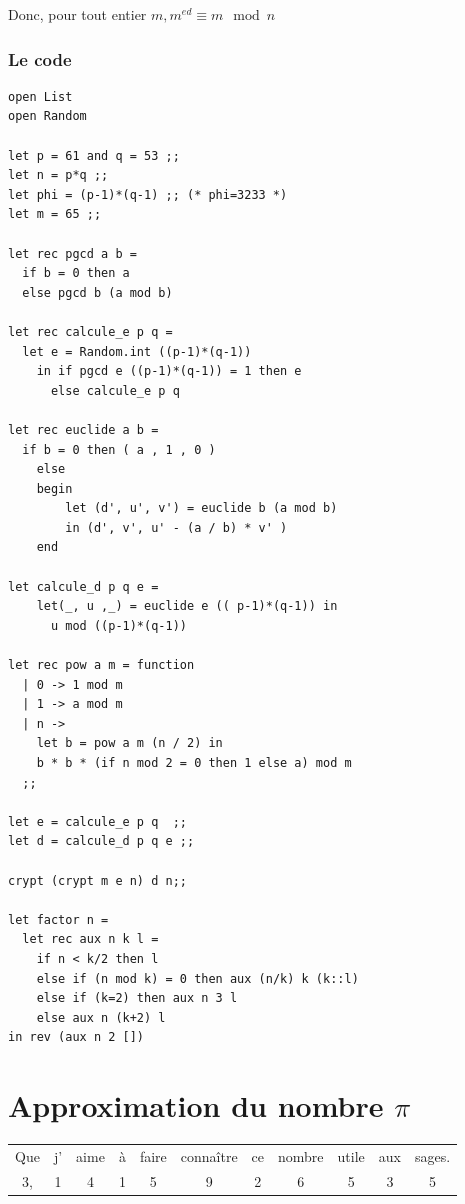 \documentclass[11pt]{book}
\begin{document}
 Donc, pour tout entier $m, m^{ed} ≡ m \mod n$

 \subsubsection{Le code}
 \begin{Verbatim}
open List
open Random 

let p = 61 and q = 53 ;;
let n = p*q ;;
let phi = (p-1)*(q-1) ;; (* phi=3233 *)
let m = 65 ;;

let rec pgcd a b =
  if b = 0 then a 
  else pgcd b (a mod b)

let rec calcule_e p q =
  let e = Random.int ((p-1)*(q-1))
    in if pgcd e ((p-1)*(q-1)) = 1 then e
      else calcule_e p q  

let rec euclide a b = 
  if b = 0 then ( a , 1 , 0 ) 
    else 
    begin
        let (d', u', v') = euclide b (a mod b)
        in (d', v', u' - (a / b) * v' )
    end

let calcule_d p q e =
    let(_, u ,_) = euclide e (( p-1)*(q-1)) in
      u mod ((p-1)*(q-1))

let rec pow a m = function
  | 0 -> 1 mod m
  | 1 -> a mod m
  | n -> 
    let b = pow a m (n / 2) in
    b * b * (if n mod 2 = 0 then 1 else a) mod m
  ;;    

let e = calcule_e p q  ;;
let d = calcule_d p q e ;;

crypt (crypt m e n) d n;;

let factor n =
  let rec aux n k l =
    if n < k/2 then l
    else if (n mod k) = 0 then aux (n/k) k (k::l)
    else if (k=2) then aux n 3 l 
    else aux n (k+2) l
in rev (aux n 2 [])
\end{Verbatim}

 \section{Approximation du nombre $\pi$ }

\begin{center}
	\begin{tabular}{ccccccccccc}
		Que & j'& aime & à & faire & connaître & ce & nombre & utile & aux & sages. \\
		3,   & 1 &  4   & 1 &  5    &  9        & 2  &  6     &  5    & 3   & 5 \\ 
	\end{tabular}	
\end{center}
\end{document}
